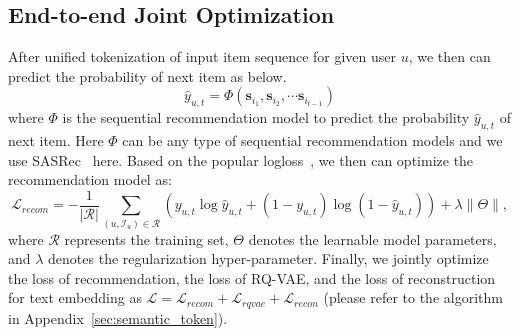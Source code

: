 \subsection{End-to-end Joint Optimization}
After unified tokenization of input item sequence for given user $u$, we then can predict the probability of next item as below.
\begin{equation}
    \hat{y}_{u, t } = \Phi (\boldsymbol{s}_{i_1}, \boldsymbol{s}_{i_2}, \cdots \boldsymbol{s}_{i_{t - 1}})
\end{equation}
where $\Phi$ is the sequential recommendation model to predict the probability $\hat{y}_{u, t }$ of next item. Here $\Phi$ can be any type of sequential recommendation models and we use SASRec~\citep{sasrec} here.
Based on the popular logloss~\citep{sasrec,dcn}, we then can optimize the recommendation model as: 
\begin{equation}\label{eq:loss}
\mathcal{L}_{recom}=-\frac{1}{|\mathcal{R}|} \sum_{(u, \mathcal{I}_{u}) \in \mathcal{R}}\left(y_{u, t} \log \hat{y}_{u, t}+\left(1-y_{u, t}\right) \log \left(1-\hat{y}_{u, t}\right)\right)  + \lambda\|\Theta\|,
\end{equation}
where $\mathcal{R}$ represents the training set, $\Theta$ denotes the learnable model parameters, and $\lambda$ denotes the regularization hyper-parameter. Finally, we jointly optimize the loss of recommendation, the loss of RQ-VAE, and the loss of reconstruction for text embedding as $\mathcal{L} = \mathcal{L}_{recom} + \mathcal{L}_{rqvae} + \mathcal{L}_{recon}$ (please refer to the algorithm in Appendix~\ref{sec:semantic_token}).


